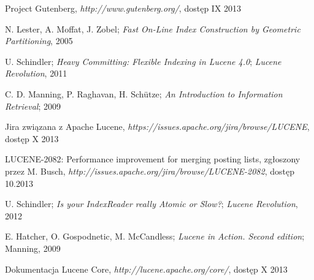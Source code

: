 \begin{thebibliography}{10}
 
  Project Gutenberg, \emph{http://www.gutenberg.org/}, dostęp IX 2013
 
  N. Lester, A. Moffat, J. Zobel; \emph{Fast On-Line Index Construction by Geometric Partitioning}, 2005
 
  U. Schindler; \emph{Heavy Committing: Flexible Indexing in Lucene 4.0}; \emph{Lucene Revolution}, 2011
 
  C. D. Manning, P. Raghavan, H. Sch\"{u}tze; \emph{An Introduction to Information Retrieval}; 2009
 
  Jira związana z Apache Lucene, \emph{https://issues.apache.org/jira/browse/LUCENE}, dostęp X 2013
 
  LUCENE-2082: Performance improvement for merging posting lists, zgłoszony przez M. Busch, \emph{http://issues.apache.org/jira/browse/LUCENE-2082}, dostęp 10.2013
 
  U. Schindler; \emph{Is your IndexReader really Atomic or Slow?}; \emph{Lucene Revolution}, 2012
 
  E. Hatcher, O. Gospodnetic, M. McCandless; \emph{Lucene in Action. Second edition}; Manning, 2009
 
  Dokumentacja Lucene Core, \emph{http://lucene.apache.org/core/}, dostęp X 2013
 
\end{thebibliography}
